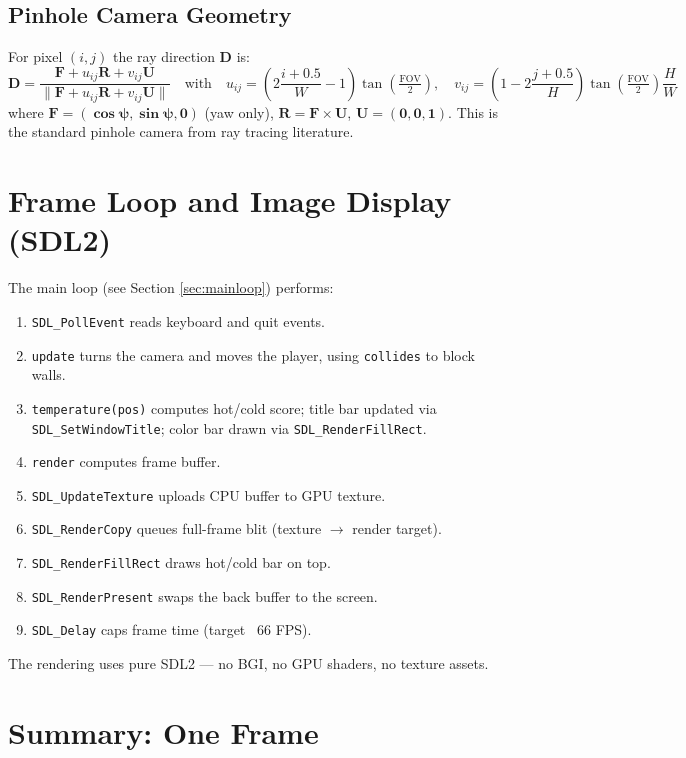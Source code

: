 \subsection{Pinhole Camera Geometry}

For pixel $(i,j)$ the ray direction $\mathbf{D}$ is:
\begin{equation}
\mathbf{D} = \frac{
    \mathbf{F} + u_{ij}\mathbf{R} + v_{ij}\mathbf{U}
}{\| \mathbf{F} + u_{ij}\mathbf{R} + v_{ij}\mathbf{U} \|}
\quad\text{with}\quad
u_{ij} = (2\frac{i+0.5}{W}-1)\tan(\tfrac{\text{FOV}}{2}),\quad
v_{ij} = (1-2\frac{j+0.5}{H})\tan(\tfrac{\text{FOV}}{2})\frac{H}{W}
\end{equation}
where $\mathbf{F = (\cos\psi, \sin\psi, 0)}$ (yaw only), $\mathbf{R = F \times U}$, $\mathbf{U = (0,0,1)}$. This is the standard pinhole camera from ray tracing literature.

\section{Frame Loop and Image Display (SDL2)}

The main loop (see Section \ref{sec:mainloop}) performs:
\begin{enumerate}
    \item \texttt{SDL_PollEvent} reads keyboard and quit events.
    \item \texttt{update} turns the camera and moves the player, using \texttt{collides} to block walls.
    \item \texttt{temperature(pos)} computes hot/cold score; title bar updated via \texttt{SDL_SetWindowTitle}; color bar drawn via \texttt{SDL_RenderFillRect}.
    \item \texttt{render} computes frame buffer.
    \item \texttt{SDL_UpdateTexture} uploads CPU buffer to GPU texture.
    \item \texttt{SDL_RenderCopy} queues full-frame blit (texture $\to$ render target).
    \item \texttt{SDL_RenderFillRect} draws hot/cold bar on top.
    \item \texttt{SDL_RenderPresent} swaps the back buffer to the screen.
    \item \texttt{SDL_Delay} caps frame time (target ~66 FPS).
\end{enumerate}
The rendering uses pure SDL2 — no BGI, no GPU shaders, no texture assets.

\section{Summary: One Frame}

